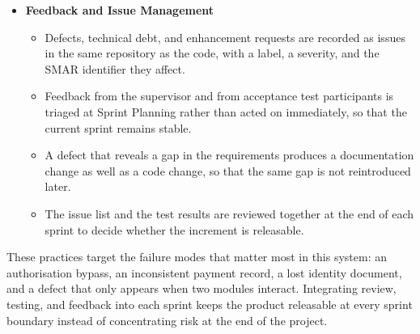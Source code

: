 \begin{itemize}
    \item \textbf{Feedback and Issue Management}
    \begin{itemize}
        \item Defects, technical debt, and enhancement requests are recorded as issues in the same repository as the code, with a label, a severity, and the SMAR identifier they affect.
        \item Feedback from the supervisor and from acceptance test participants is triaged at Sprint Planning rather than acted on immediately, so that the current sprint remains stable.
        \item A defect that reveals a gap in the requirements produces a documentation change as well as a code change, so that the same gap is not reintroduced later.
        \item The issue list and the test results are reviewed together at the end of each sprint to decide whether the increment is releasable.
    \end{itemize}
\end{itemize}

These practices target the failure modes that matter most in this system: an authorisation bypass, an inconsistent payment record, a lost identity document, and a defect that only appears when two modules interact. Integrating review, testing, and feedback into each sprint keeps the product releasable at every sprint boundary instead of concentrating risk at the end of the project.
